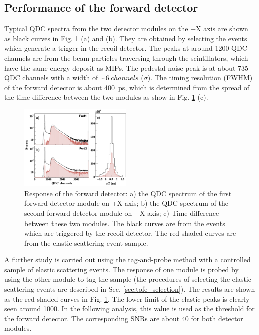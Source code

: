\documentclass[number,5p]{elsarticle}
\begin{document}
\subsection{Performance of the forward detector}
\label{sec:fwd_performance}

Typical QDC spectra from the two detector modules on the +X axis are shown as
black curves in Fig. \ref{fig:fwd_performance} (a) and (b).
They are obtained by selecting the events which generate a trigger in the recoil detector.
The peaks at around \num{1200} QDC channels are from the beam particles traversing through the scintillators, which have the same energy deposit as MIPs.
The pedestal noise peak is at about \num{735} QDC channels with a width of
$\sim\SI{6}{channels}$ ($\sigma$).
The timing resolution (FWHM) of the forward detector is about \SI{400}{ps}, which is determined from the spread of the time difference between the two modules as show in Fig. \ref{fig:fwd_performance} (c).
\begin{figure}[b!]
  \centering
  \includegraphics[width=0.48\textwidth]{./fwd_performance_elastic.png}
  \caption{Response of the forward detector: a) the QDC spectrum of the first forward detector module on +X axis;
    b) the QDC spectrum of the second forward detector module on +X axis; c) Time difference between these two modules.
    The black curves are from the events which are triggered by the recoil
    detector.
    The red shaded curves are from the elastic scattering event sample.
  }
  \label{fig:fwd_performance}
\end{figure}

A further study is carried out using the tag-and-probe method with a controlled
sample of elastic scattering events.
The response of one module is probed by using the other module to tag the sample
(the procedures of selecting the elastic scattering events are described in Sec. \ref{sec:tofe_selection}).
The results are shown as the red shaded curves in Fig. \ref{fig:fwd_performance}.
The lower limit of the elastic peaks is clearly seen around \num{1000}.
In the following analysis, this value is used as the threshold for the forward detector.
The corresponding SNRs are about \num{40} for both detector modules.
\end{document}
